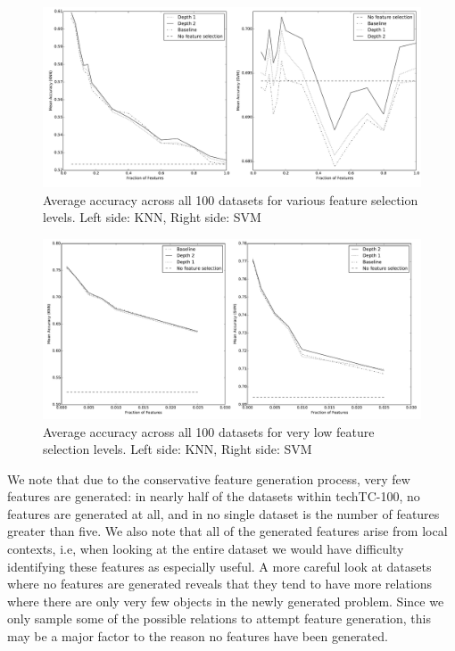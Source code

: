 \documentclass{article}
\theoremstyle{definition}
\begin{document}
\begin{figure}[H]
	\centering
	\includegraphics[width=\linewidth]{accuracy.pdf}
	\caption{Average accuracy across all 100 datasets for various feature selection levels. Left side: KNN, Right side: SVM}
	\label{fig:accuracy}
\end{figure}

\begin{figure}[H]
	\centering
	\includegraphics[width=\linewidth]{accuracy_low.pdf}
	\caption{Average accuracy across all 100 datasets for very low feature selection levels. Left side: KNN, Right side: SVM}
	\label{fig:accuracy_low}
\end{figure}

We note that due to the conservative feature generation process, very few features are generated: in nearly half of the datasets within techTC-100, no features are generated at all, and in no single dataset is the number of features greater than five. We also note that all of the generated features arise from local contexts, i.e, when looking at the entire dataset we would have difficulty identifying these features as especially useful. A more careful look at datasets where no features are generated reveals that they tend to have more relations where there are only very few objects in the newly generated problem. Since we only sample some of the possible relations to attempt feature generation, this may be a major factor to the reason no features have been generated.
\end{document}
